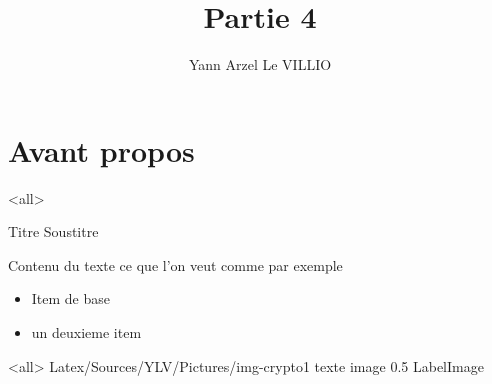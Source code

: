 
%


\title{Partie 4}
\author{Yann Arzel Le VILLIO}



\maketitle

\section{Avant propos}



\mode<all>{\texframe
{Titre} %
{Soustitre} %
{
	Contenu du texte ce que l'on veut comme par exemple
 \begin{itemize}
    \item Item de base
    \item un deuxieme item
 \end{itemize}
}}


\mode<all>{\picframe
{Latex/Sources/YLV/Pictures/img-crypto1}%
{texte image} %
{0.5} %
{LabelImage} %
}





